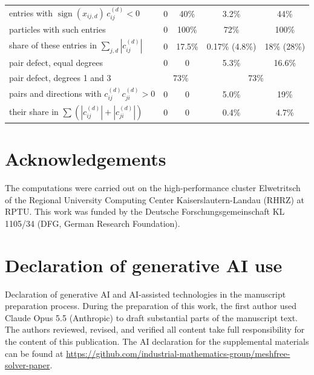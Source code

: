 \documentclass[11pt,a4paper]{article}
\numberwithin{equation}{section}
\newcommand{\sgn}{\operatorname{sign}}
\begin{document}
\begin{table}[!htbp]
\begin{tabular}{lcccc}
entries with $\sgn(x_{ij,d})\,c^{(d)}_{ij}<0$ & 0 & 40\% & 3.2\% & 44\%\\
particles with such entries & 0 & 100\% & 72\% & 100\%\\
share of these entries in $\sum_{j,d}|c^{(d)}_{ij}|$ & 0 & 17.5\% & 0.17\% (4.8\%) & 18\% (28\%)\\
pair defect, equal degrees & 0 & 0 & 5.3\% & 16.6\%\\
pair defect, degrees 1 and 3 & \multicolumn{2}{c}{73\%} & \multicolumn{2}{c}{73\%}\\
pairs and directions with $c^{(d)}_{ij}c^{(d)}_{ji}>0$ & 0 & 0 & 5.0\% & 19\%\\
\quad their share in $\sum(|c^{(d)}_{ij}|+|c^{(d)}_{ji}|)$ & 0 & 0 & 0.4\% & 4.7\%\\
\bottomrule
\end{tabular}
\end{table}


\section*{Acknowledgements}
The computations were carried out on the high-performance cluster Elwetritsch of the Regional University Computing Center Kaiserslautern-Landau (RHRZ) at RPTU. This work was funded by the Deutsche Forschungsgemeinschaft KL 1105/34 (DFG, German Research Foundation).

\section*{Declaration of generative AI use}
Declaration of generative AI and AI-assisted technologies in the manuscript preparation process. During the preparation of this work, the first author used Claude Opus 5.5 (Anthropic) to draft substantial parts of the manuscript text. The authors reviewed, revised, and verified all content take full responsibility for the content of this publication. The AI declaration for the supplemental materials can be found at \url{https://github.com/industrial-mathematics-group/meshfree-solver-paper}.



\end{document}
